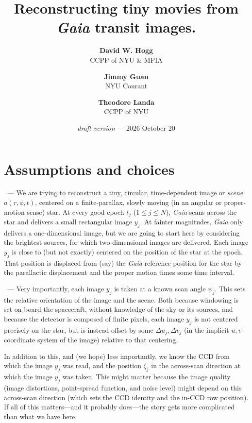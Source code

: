 \documentclass{article}
\title{\bfseries Reconstructing tiny movies from \textsl{Gaia} transit images.}
\author{%
\textbf{David W. Hogg} \\ CCPP of NYU \& MPIA
\and
\textbf{Jimmy Guan} \\ NYU Courant
\and
\textbf{Theodore Landa} \\ CCPP of NYU
}
\date{\textit{draft version} --- 2026 October 20}
\renewcommand{\paragraph}[1]{\par\medskip\noindent{\textbf{#1}}~---}
\begin{document}
\maketitle

\section{Assumptions and choices}
\paragraph{Setup}
We are trying to reconstruct a tiny, circular, time-dependent image or \emph{scene} $a(r,\phi,t)$, centered on a finite-parallax, slowly moving (in an angular or proper-motion sense) star.
At every good epoch $t_j$ ($1\leq j\leq N$), \textsl{Gaia} scans across the star and delivers a small rectangular image $y_j$.
At fainter magnitudes, \textsl{Gaia} only delivers a one-dimensional image, but we are going to start here by considering the brightest sources, for which two-dimensional images are delivered.
Each image $y_j$ is close to (but not exactly) centered on the position of the star at the epoch.
That position is displaced from (say) the \textsl{Gaia} reference position for the star by the parallactic displacement and the proper motion times some time interval.

\paragraph{Housekeeping data}
Very importantly, each image $y_j$ is taken at a known scan angle $\psi_j$.
This sets the relative orientation of the image and the scene.
Both because windowing is set on board the spacecraft, without knowledge of the sky or its sources,
and because the detector is composed of finite pixels,
each image $y_j$ is not centered precisely on the star, but is instead offset by some $\Delta u_j,\Delta v_j$ (in the implicit $u,v$ coordinate system of the image) relative to that centering.

In addition to this, and (we hope) less importantly, we know the CCD from which the image $y_j$ was read, and the position $\zeta_j$ in the across-scan direction at which the image $y_j$ was taken.
This might matter because the image quality (image distortions, point-spread function, and noise level) might depend on this across-scan direction (which sets the CCD identity and the in-CCD row position).
If all of this matters---and it probably does---the story gets more complicated than what we have here.
\end{document}
